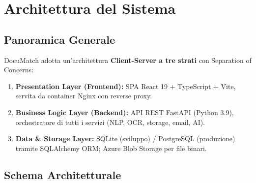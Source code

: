 \documentclass[12pt,a4paper,oneside]{report}
\begin{document}
\chapter{Architettura del Sistema}

\section{Panoramica Generale}

DocuMatch adotta un'architettura \textbf{Client-Server a tre strati} con Separation of Concerns:

\begin{enumerate}
    \item \textbf{Presentation Layer (Frontend):} SPA React 19 + TypeScript + Vite,
          servita da container Nginx con reverse proxy.
    \item \textbf{Business Logic Layer (Backend):} API REST FastAPI (Python 3.9),
          orchestratore di tutti i servizi (NLP, OCR, storage, email, AI).
    \item \textbf{Data \& Storage Layer:} SQLite (sviluppo) / PostgreSQL (produzione)
          tramite SQLAlchemy ORM; Azure Blob Storage per file binari.
\end{enumerate}

\section{Schema Architetturale}
\end{document}
